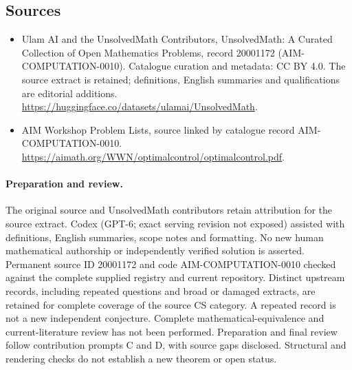 \documentclass[11pt]{article}
\begin{document}
\subsection{Sources}
\begin{itemize}
\item[\hypertarget{source:20001172:1}{S1}] Ulam AI and the UnsolvedMath Contributors, UnsolvedMath: A Curated Collection of Open Mathematics Problems, record 20001172 (AIM-COMPUTATION-0010). Catalogue curation and metadata: CC BY 4.0. The source extract is retained; definitions, English summaries and qualifications are editorial additions.
\url{https://huggingface.co/datasets/ulamai/UnsolvedMath}.
\item[\hypertarget{source:20001172:2}{S2}] AIM Workshop Problem Lists, source linked by catalogue record AIM-COMPUTATION-0010.
\url{https://aimath.org/WWN/optimalcontrol/optimalcontrol.pdf}.
\end{itemize}
\paragraph{Preparation and review.}
The original source and UnsolvedMath contributors retain attribution for the source extract. Codex (GPT-6; exact serving revision not exposed) assisted with definitions, English summaries, scope notes and formatting. No new human mathematical authorship or independently verified solution is asserted. Permanent source ID 20001172 and code AIM-COMPUTATION-0010 checked against the complete supplied registry and current repository. Distinct upstream records, including repeated questions and broad or damaged extracts, are retained for complete coverage of the source CS category. A repeated record is not a new independent conjecture. Complete mathematical-equivalence and current-literature review has not been performed. Preparation and final review follow contribution prompts C and D, with source gaps disclosed. Structural and rendering checks do not establish a new theorem or open status.
\label{end:20001172}
\end{document}
